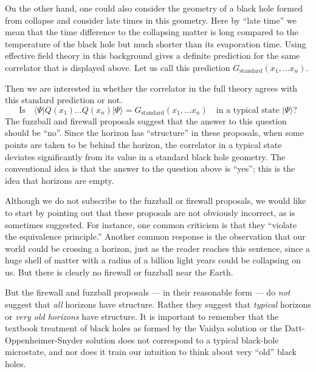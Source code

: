 \documentclass[12pt]{article}
\def\qop{Q}
\newcommand{\be}{\begin{equation}}
\newcommand{\ee}{\end{equation}}
\begin{document}
On the other hand, one could also consider the geometry of a black hole formed from collapse and consider late times in this geometry. Here by ``late time'' we  mean that the time difference to the collapsing matter is long  compared to the temperature of the black hole but much shorter than its evaporation time. Using effective field theory in this background gives a definite prediction for the same correlator that is displayed above.  Let us call this prediction $G_{\text{standard}}(x_1, \ldots x_n)$.

Then we are interested in whether the correlator in the full theory agrees with this standard prediction or not.
\be
\label{structurequestion}
\text{Is}\quad \langle \Psi |  \qop(x_1) \ldots \qop(x_n) |\Psi \rangle = G_{\text{standard}}(x_1, \ldots x_n) \quad \text{in~a~typical~state~$|\Psi \rangle$?}
\ee
The fuzzball and firewall proposals suggest that the answer to this question should be ``no''. Since the horizon has ``structure'' in these proposals, when some points are taken to be behind the horizon, the correlator in a typical state deviates significantly from its value in a standard black hole geometry. The conventional idea is that the answer to the question above is ``yes''; this is the idea that horizons are empty.

Although we do not subscribe to the fuzzball or firewall proposals, we would like to start by pointing out that these proposals are not obviously incorrect, as is sometimes suggested.
For instance, one common criticism is that they ``violate the equivalence principle.'' Another common response is the  observation that our world could be crossing a horizon, just as the reader reaches this sentence,  since a huge shell of matter with a radius of a billion light years could be collapsing on us. But there is clearly no firewall or fuzzball near the Earth.

But the firewall and fuzzball proposals --- in their reasonable form ---  do {\em not} suggest that {\em all} horizons have structure. Rather they suggest that {\em typical} horizons or {\em very old horizons} have structure. It is important to remember that the textbook treatment of black holes as formed by the Vaidya solution \cite{vaidya1951gravitational}  or the Datt-Oppenheimer-Snyder solution \cite{datt1999class,oppenheimer1939continued} does not correspond to a typical black-hole microstate, and nor does it train our intuition to think about very ``old'' black holes.
\end{document}
